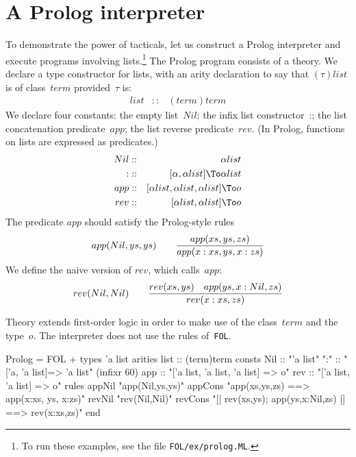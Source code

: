 \section{A Prolog interpreter}
To demonstrate the power of tacticals, let us construct a Prolog
interpreter and execute programs involving lists.\footnote{To run these
examples, see the file {\tt FOL/ex/prolog.ML}.} The Prolog program
consists of a theory.  We declare a type constructor for lists, with an
arity declaration to say that $(\tau)list$ is of class~$term$
provided~$\tau$ is:
\begin{eqnarray*}
  list  & :: & (term)term
\end{eqnarray*}
We declare four constants: the empty list~$Nil$; the infix list
constructor~{:}; the list concatenation predicate~$app$; the list reverse
predicate~$rev$.  (In Prolog, functions on lists are expressed as
predicates.)
\begin{eqnarray*}
    Nil         & :: & \alpha list \\
    {:}         & :: & [\alpha,\alpha list] \To \alpha list \\
    app & :: & [\alpha list,\alpha list,\alpha list] \To o \\
    rev & :: & [\alpha list,\alpha list] \To o 
\end{eqnarray*}
The predicate $app$ should satisfy the Prolog-style rules
\[ {app(Nil,ys,ys)} \qquad
   {app(xs,ys,zs) \over app(x:xs, ys, x:zs)} \]
We define the naive version of $rev$, which calls~$app$:
\[ {rev(Nil,Nil)} \qquad
   {rev(xs,ys)\quad  app(ys, x:Nil, zs) \over
    rev(x:xs, zs)} 
\]

Theory  extends first-order logic in order to make use
of the class~$term$ and the type~$o$.  The interpreter does not use the
rules of~{\tt FOL}.
\begin{ttbox}
Prolog = FOL +
types   'a list
arities list    :: (term)term
consts  Nil     :: "'a list"
        ":"     :: "['a, 'a list]=> 'a list"            (infixr 60)
        app     :: "['a list, 'a list, 'a list] => o"
        rev     :: "['a list, 'a list] => o"
rules   appNil  "app(Nil,ys,ys)"
        appCons "app(xs,ys,zs) ==> app(x:xs, ys, x:zs)"
        revNil  "rev(Nil,Nil)"
        revCons "[| rev(xs,ys); app(ys,x:Nil,zs) |] ==> rev(x:xs,zs)"
end
\end{ttbox}
